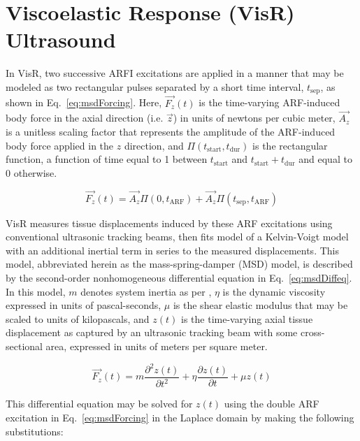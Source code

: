 \section{Viscoelastic Response (VisR) Ultrasound}

In VisR, two successive ARFI excitations are applied in a manner that may be modeled as two rectangular pulses separated by a short time interval, $t_{\textrm{sep}}$, as shown in Eq.~\eqref{eq:msdForcing}. Here, $\overrightarrow{F_{z}}(t)$ is the time-varying ARF-induced body force in the axial direction (i.e. $\overrightarrow{z}$) in units of newtons per cubic meter, $\overrightarrow{A_{z}}$ is a unitless scaling factor that represents the amplitude of the ARF-induced body force applied in the $z$ direction, and $\Pi\left( t_{\textrm{start}}, t_{\textrm{dur}} \right)$ is the rectangular function, a function of time equal to 1 between $t_{\textrm{start}}$ and $t_{\textrm{start}} + t_{\textrm{dur}}$ and equal to 0 otherwise. 

\begin{equation}
    \overrightarrow{F_{z}}(t) = \overrightarrow{A_{z}} \Pi\left( 0, t_{\textrm{ARF}} \right) + \overrightarrow{A_{z}} \Pi\left( t_{\textrm{sep}}, t_{\textrm{ARF}}\right)
    \label{eq:msdForcing}
\end{equation}

VisR measures tissue displacements induced by these ARF excitations using conventional ultrasonic tracking beams, then fits model of a Kelvin-Voigt model with an additional inertial term in series to the measured displacements. This model, abbreviated herein as the mass-spring-damper (MSD) model, is described by the second-order nonhomogeneous differential equation in Eq.~\ref{eq:msdDiffeq}. In this model, $m$ denotes system inertia as per \cite{selzo_Quantitative_2016}, $\eta$ is the dynamic viscosity expressed in units of pascal-seconds, $\mu$ is the shear elastic modulus that may be scaled to units of kilopascals, and $z(t)$ is the time-varying axial tissue displacement as captured by an ultrasonic tracking beam with some cross-sectional area, expressed in units of meters per square meter.

\begin{equation}
    \overrightarrow{F_{z}}(t) = m \frac{\partial^{2} z(t) }{\partial t^{2}} + \eta \frac{\partial z(t)}{\partial t} + \mu z(t)
    \label{eq:msdDiffeq}
\end{equation}

This differential equation may be solved for $z(t)$ using the double ARF excitation in Eq.~\eqref{eq:msdForcing} in the Laplace domain by making the following substitutions:

